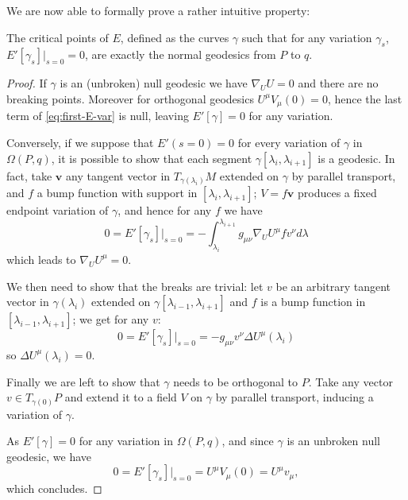 We are now able to formally prove a rather intuitive property:
\begin{prop}
	\label{prop:perp-critical-gamma}
	The critical points of \(E\), defined as the curves \(\gamma\) such that for any variation \(\gamma_s\), \(E'[\gamma_s]\Big\vert_{s = 0} = 0\), are exactly the normal geodesics from \(P\) to \(q\).
\end{prop}
\begin{proof}
	If \(\gamma\) is an (unbroken) null geodesic we have \(\nabla_UU = 0\) and there are no breaking points. Moreover for orthogonal geodesics
	\(U^{\mu}V_{\mu}(0) = 0\), hence the last term of \eqref{eq:first-E-var} is null, leaving \(E'[\gamma] = 0\) for any variation.
	
	Conversely, if we suppose that \(E'(s =0) = 0\) for every variation of \(\gamma\) in \(\Omega (P,q)\), it is possible to show that each segment \(\gamma[\lambda_i, \lambda_{i + 1}]\) is a geodesic.
	In fact, take \(\textbf{v}\) any tangent vector in \(T_{\gamma(\lambda_i)}M\)  extended on \(\gamma\) by parallel transport, and \(f\) a bump function with support in \([\lambda_i, \lambda_{i + 1}]\); \(V = f\textbf{v}\) produces a fixed endpoint variation of \(\gamma\), and hence for any \(f\) we have 
	\[
	0 = E'[\gamma_s]\vert_{s = 0} = -\int_{\lambda_i}^{\lambda_{i+1}} g_{\mu\nu}\nabla_UU^{\mu} f v^{\nu} d\lambda
	\]
	which leads to \(\nabla_UU^{\mu} = 0\).
	
	We then need to show that the breaks are trivial: let \(v\) be an arbitrary tangent vector in \(\gamma(\lambda_i)\) extended on \(\gamma[\lambda_{i - 1}, \lambda_{i + 1}]\) and \(f\) is a bump function in \([\lambda_{i - 1}, \lambda_{i + 1}]\); we get for any \(v\):
	\[
	0 = E'[\gamma_s]\vert_{s = 0} = -g_{\mu\nu}v^{\nu}\Delta U^{\mu}(\lambda_i)
	\]
	so \(\Delta U^{\mu}(\lambda_i) = 0\).
	
	Finally we are left to show that \(\gamma\) needs to be orthogonal to \(P\). Take any vector \(v \in T_{\gamma(0)}P\) and extend it to a field \(V\) on \(\gamma\) by parallel transport, inducing a variation of \(\gamma\).
	
	\noindent As \(E'[\gamma] = 0\) for any variation in \(\Omega(P, q)\), and since \(\gamma\) is an unbroken null geodesic, we have
	\[
	0 = E'[\gamma_s] \Big\vert_{s = 0} = U^{\mu}V_{\mu} (0) = U^{\mu}v_{\mu},
	\]
	which concludes.
\end{proof}

